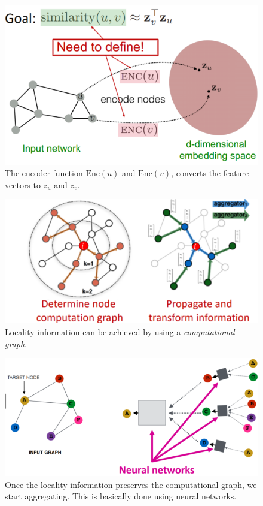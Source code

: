 \begin{figure}[H]
    \centering
    \includegraphics[width=\textwidth]{images/fromInputNetworkToEmbeddingSpace.png}
    \caption{The encoder function $\text{Enc}(u)$ and $\text{Enc}(v)$, converts the feature vectors to $z_u$ and $z_v$.}
    \label{fig:fromInputNetworkToEmbeddingSpace}
\end{figure}

\begin{figure}[H]
    \centering
    \includegraphics[width=\textwidth]{images/computationalGraph.png}
    \caption{Locality information can be achieved by using a \textit{computational graph}.}
    \label{fig:computationalGraph}
\end{figure}

\begin{figure}[H]
    \centering
    \includegraphics[width=\textwidth]{images/computationalGraphNeuralNetwork.png}
    \caption{Once the locality information preserves the computational graph, we start aggregating. This is basically done using neural networks.}
    \label{fig:computationalGraphNeuralNetwork}
\end{figure}

